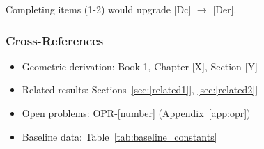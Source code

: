 Completing items (1-2) would upgrade [Dc] $\to$ [Der].


\subsubsection{Cross-References}

\begin{itemize}
\item Geometric derivation: Book 1, Chapter [X], Section [Y]
\item Related results: Sections~\ref{sec:[related1]}, \ref{sec:[related2]}
\item Open problems: OPR-[number] (Appendix~\ref{app:opr})
\item Baseline data: Table~\ref{tab:baseline_constants}
\end{itemize}


